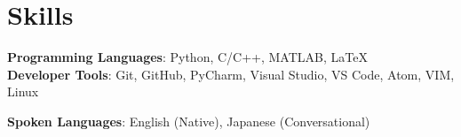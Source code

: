 \documentclass[letterpaper,11pt]{article}
\makeatletter
\newcommand{\resumeItem}[1]{
  \item\small{
    {#1 \vspace{-2pt}}
  }
}
\newcommand{\resumeSubheading}[4]{
  \vspace{-2pt}\item
    \begin{tabular*}{0.97\textwidth}[t]{l@{\extracolsep{\fill}}r}
      \textbf{#1} & #2 \\
      \textit{\small#3} & \textit{\small #4} \\
    \end{tabular*}\vspace{-7pt}
}
\newcommand{\resumeSubHeadingListStart}{\begin{itemize}[leftmargin=0.15in, label={}]}
\newcommand{\resumeSubHeadingListEnd}{\end{itemize}}
\newcommand{\resumeItemListStart}{\begin{itemize}}
\newcommand{\resumeItemListEnd}{\end{itemize}\vspace{-5pt}}
\makeatother
\begin{document}
\section{Skills}
\begin{itemize}[leftmargin=0.15in, label={}]
	\small{\item{
			\textbf{Programming Languages}{: 
				Python, 
				C/C++, 
				MATLAB, 
				LaTeX
				} \\
			\textbf{Developer Tools}{: 
				Git, 
				GitHub, 
				PyCharm, 
				Visual Studio, 
				VS Code, 
				Atom, 
				VIM,
				Linux
				} \\
			\begin{comment}
			\textbf{Libraries}{: 
				Adafruit Arduino Libraries, 
				Wire, 
				LiquidCrystal
				} \\
			\end{comment}
			\begin{comment}
				\textbf{FrameWorks}{: 
					Jupiter,
					PythonSV
				} \\
			\end{comment}
			\textbf{Spoken Languages}{: English (Native), Japanese (Conversational)}
	}}
\end{itemize}


\begin{comment}
\section{Employment History}
	\resumeSubHeadingListStart
	
		\resumeSubheading
			{System Validation Engineer}{January 2021 -- Present}
			{Intel Corporation}{Hillsboro, OR}
		\resumeItemListStart
			\resumeItem{Post-silicon functional validation of memory controller hardware for Intel Xeon processors}
			\resumeItem{Debug failures and identify areas for improvement in post-silicon test content}
			\resumeItem{Created, defined, and developed system validation environment and test suites}
			\resumeItem{Responsible for validating three features, resulting in the identification of one silicon bug and several BIOS bugs}
	\resumeItemListEnd
\resumeSubHeadingListEnd
\end{comment}
\end{document}
